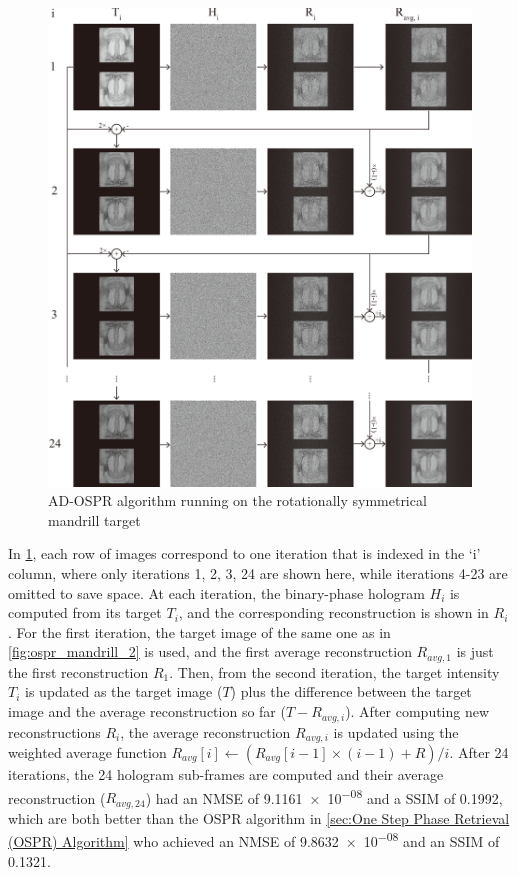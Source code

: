 \begin{figure}[H]
	\centering
	\includegraphics[width=1.0\textwidth]{adospr_mandrill_2.pdf}
	\caption{AD-OSPR algorithm running on the rotationally symmetrical mandrill target}
	\label{fig:adospr_mandrill_2}
\end{figure}

In \cref{fig:adospr_mandrill_2}, each row of images correspond to one iteration that is indexed in the `i' column, where only iterations 1, 2, 3, 24 are shown here, while iterations 4-23 are omitted to save space. At each iteration, the binary-phase hologram $H_i$ is computed from its target $T_i$, and the corresponding reconstruction is shown in $R_i$. For the first iteration, the target image of the same one as in \cref{fig:ospr_mandrill_2} is used, and the first average reconstruction $R_{avg, 1}$ is just the first reconstruction $R_1$. Then, from the second iteration, the target intensity $T_i$ is updated as the target image ($T$) plus the difference between the target image and the average reconstruction so far ($T-R_{avg, i}$). After computing new reconstructions $R_i$, the average reconstruction $R_{avg, i}$ is updated using the weighted average function $R_{avg}[i] \gets (R_{avg}[i-1] \times (i-1) + R)/i$. After 24 iterations, the 24 hologram sub-frames are computed and their average reconstruction ($R_{avg, 24}$) had an NMSE of \num{9.1161e-08} and a SSIM of 0.1992, which are both better than the OSPR algorithm in \cref{sec:One Step Phase Retrieval (OSPR) Algorithm} who achieved an NMSE of \num{9.8632e-08} and an SSIM of 0.1321.

